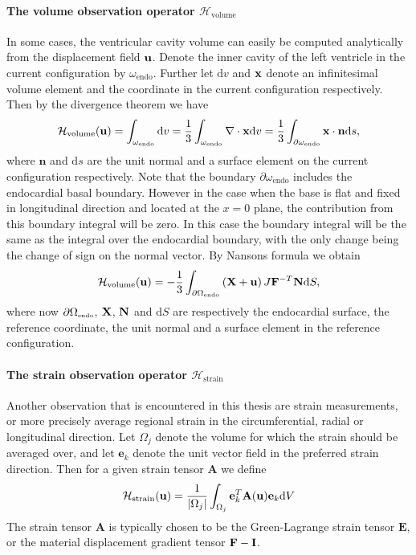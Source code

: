 \paragraph{The volume observation operator
  $\mathcal{H}_{\mathrm{volume}}$}
In some cases, the ventricular cavity volume can easily be computed
analytically from the displacement field $\mathbf{u}$. Denote the inner
cavity of the left ventricle in the current configuration by
$\omega_{\mathrm{endo}}$. Further let $\mathrm{d} v$ and $\mathbf{x}$
denote an infinitesimal volume element and the coordinate in the
current configuration respectively. Then by the divergence theorem we have
\begin{align}
  \mathcal{H}_{\mathrm{volume}}(\mathbf{u})= \int_{\omega_{\mathrm{endo}}} \mathrm{d} v =
  \frac{1}{3}\int_{\omega_{\mathrm{endo}}} \nabla \cdot \mathbf{x} \mathrm{d} v =
  \frac{1}{3}\int_{\partial \omega_{\mathrm{endo}}} \mathbf{x} \cdot \mathbf{n} \mathrm{d} s, 
\end{align}
where $\mathbf{n}$ and $\mathrm{d} s$ are the unit normal and a surface
element on the current configuration respectively.
Note that the boundary $\partial \omega_{\mathrm{endo}}$ includes the
endocardial basal boundary. However in the case when the base is flat
and fixed in longitudinal direction and located at the $x=0$ plane,
the contribution from this boundary integral will be zero. In this case the boundary integral
will be the same as the integral over the endocardial boundary, with
the only change being the change of sign on the normal vector. By
Nansons formula we obtain 
\begin{align}
  \mathcal{H}_{\mathrm{volume}}(\mathbf{u})= -\frac{1}{3}\int_{\partial \Omega_{ \textnormal{\tiny \text{endo}}}} \left( \mathbf{X} + \mathbf{u} \right) J \mathbf{F}^{-T} \mathbf{N} \mathrm{d}S,
  \label{eq:volume_operator}
\end{align}
where now $\partial \Omega_{ \textnormal{\tiny \text{endo}}}$,  $\mathbf{X}$, $\mathbf{N}$ and $\mathrm{d}S$ are respectively the
endocardial surface, the reference coordinate, the unit normal and a
surface element in the reference configuration.


\paragraph{The strain observation operator
  $\mathcal{H}_{\mathrm{strain}}$}
Another observation that is encountered in this thesis are strain
measurements, or more precisely average regional strain in the
circumferential, radial or longitudinal direction. Let $\Omega_j$
denote the volume for which the strain should be averaged over, and
let $\mathbf{e}_k$ denote the unit vector field in the preferred strain
direction. Then for a given strain tensor $\mathbf{A}$ we define 
\begin{align}
  \mathcal{H}_{\mathrm{strain}}(\mathbf{u}) = \frac{1}{|\Omega_j|}\int_{\Omega_j} \mathbf{e}_k^T \mathbf{A}(\mathbf{u}) \mathbf{e}_k  \mathrm{d}V
\end{align}
The strain tensor $ \mathbf{A}$ is typically chosen to be the
Green-Lagrange strain tensor $\mathbf{E}$, or
the material displacement gradient tensor $\mathbf{F} - \mathbf{I}$.

